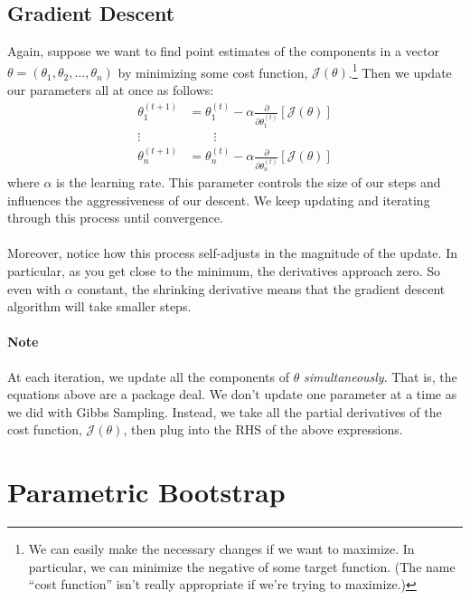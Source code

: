 \documentclass[a4paper,12pt]{scrartcl}
\begin{document}
\newpage
\subsection{Gradient Descent}

Again, suppose we want to find point estimates of the components in
a vector $\theta = (\theta_1, \theta_2, \ldots, \theta_n)$ by
minimizing some cost function, $\mathcal{J}(\theta)$.\footnote{We
can easily make the necessary changes if we want to maximize. In
particular, we can minimize the negative of some target function. (The
name ``cost function'' isn't really appropriate if we're trying to 
maximize.)} Then we update our parameters all at once as follows:
\begin{align*}
   \theta_1^{(t+1)} &= \theta_1^{(t)} - \alpha \frac{\partial}{
      \partial \theta_1^{(t)}}\left[ \mathcal{J}(\theta)\right]\\
   \vdots \qquad & \qquad \vdots \\
   \theta_n^{(t+1)} &= \theta_n^{(t)} - \alpha \frac{\partial}{
      \partial \theta_n^{(t)}}\left[ \mathcal{J}(\theta)\right]
\end{align*}
where $\alpha$ is the learning rate. This parameter controls the
size of our steps and influences the aggressiveness of our 
descent.
We keep updating and iterating through this process until convergence.  
\\
\\
Moreover, notice how this process self-adjusts in the
magnitude of the update.  In particular, as you get close to
the minimum, the derivatives approach zero.  So even with 
$\alpha$ constant, the shrinking derivative means that the gradient
descent algorithm will take smaller steps.


\paragraph{Note} At each iteration, we update all the components of 
$\theta$ \emph{simultaneously}. That is, the equations above are a 
package deal. We don't update one parameter at a time as we did
with Gibbs Sampling. Instead, we take all the partial derivatives
of the cost function, $\mathcal{J}(\theta)$, then plug into the RHS
of the above expressions.







\newpage
\section{Parametric Bootstrap}
\end{document}
